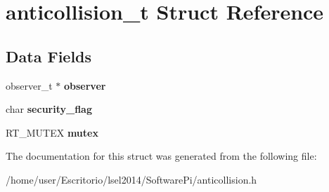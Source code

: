 \hypertarget{structanticollision__t}{\section{anticollision\-\_\-t \-Struct \-Reference}
\label{structanticollision__t}
}
\subsection*{\-Data \-Fields}
\begin{DoxyCompactItemize}
\item 
\hypertarget{structanticollision__t_a7f73cbc739aeb9482e91bb2237bd1622}{observer\-\_\-t $\ast$ {\bfseries observer}}\label{structanticollision__t_a7f73cbc739aeb9482e91bb2237bd1622}

\item 
\hypertarget{structanticollision__t_a1840c777933cbe206303817df4479bb4}{char {\bfseries security\-\_\-flag}}\label{structanticollision__t_a1840c777933cbe206303817df4479bb4}

\item 
\hypertarget{structanticollision__t_a0f7cb653e4868764b1afbc7975f436fb}{\-R\-T\-\_\-\-M\-U\-T\-E\-X {\bfseries mutex}}\label{structanticollision__t_a0f7cb653e4868764b1afbc7975f436fb}

\end{DoxyCompactItemize}


\-The documentation for this struct was generated from the following file\-:\begin{DoxyCompactItemize}
\item 
/home/user/\-Escritorio/lsel2014/\-Software\-Pi/anticollision.\-h\end{DoxyCompactItemize}
